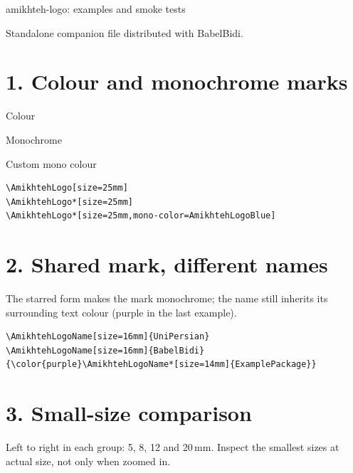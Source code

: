 \documentclass[a4paper,11pt]{article}
\newcommand*\Sample[2]{%
  \begin{minipage}[t]{.30\linewidth}
    \centering #1\par\small\ttfamily #2
  \end{minipage}%
}
\begin{document}
\begin{center}
  {\LARGE\sffamily amikhteh-logo: examples and smoke tests}\par
  Standalone companion file distributed with BabelBidi.
\end{center}

\section*{1. Colour and monochrome marks}

\Sample{\AmikhtehLogo[size=25mm]}{Colour}
\hfill
\Sample{\AmikhtehLogo*[size=25mm]}{Monochrome}
\hfill
\Sample{\AmikhtehLogo*[size=25mm,mono-color=AmikhtehLogoBlue]}{Custom mono colour}

\begin{verbatim}
\AmikhtehLogo[size=25mm]
\AmikhtehLogo*[size=25mm]
\AmikhtehLogo*[size=25mm,mono-color=AmikhtehLogoBlue]
\end{verbatim}

\section*{2. Shared mark, different names}

\hfill
{}
\par
{\color{purple}}

The starred form makes the mark monochrome; the name still inherits
its surrounding text colour (purple in the last example).

\begin{verbatim}
\AmikhtehLogoName[size=16mm]{UniPersian}
\AmikhtehLogoName[size=16mm]{BabelBidi}
{\color{purple}\AmikhtehLogoName*[size=14mm]{ExamplePackage}}
\end{verbatim}

\section*{3. Small-size comparison}

\AmikhtehLogo[size=5mm]\quad
\AmikhtehLogo[size=8mm]\quad
\AmikhtehLogo[size=12mm]\quad
\AmikhtehLogo[size=20mm]
\hfill
\AmikhtehLogo*[size=5mm]\quad
\AmikhtehLogo*[size=8mm]\quad
\AmikhtehLogo*[size=12mm]\quad
\AmikhtehLogo*[size=20mm]

Left to right in each group: 5, 8, 12 and 20\,mm.
Inspect the smallest sizes at actual size, not only when zoomed in.
\end{document}
